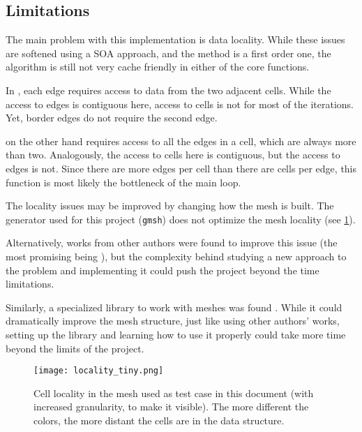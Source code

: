 \subsection{Limitations}
\label{sec:omp:limitations}


The main problem with this implementation is data locality.
While these issues are softened using a SOA approach, and the method is a first order one, the algorithm is still not very cache friendly in either of the core functions.

In \computeflux, each edge requires access to data from the two adjacent cells. While the access to edges is contiguous here, access to cells is not for most of the iterations. Yet, border edges do not require the second edge.

\update on the other hand requires access to all the edges in a cell, which are always more than two.
Analogously, the access to cells here is contiguous, but the access to edges is not.
Since there are more edges per cell than there are cells per edge, this function is most likely the bottleneck of the main loop.

The locality issues may be improved by changing how the mesh is built.
The generator used for this project (\texttt{gmsh}) does not optimize the mesh locality (see \cref{fig:locality}).

Alternatively, works from other authors were found to improve this issue (the most promising being \cite{hoppe99}), but the complexity behind studying a new approach to the problem and implementing it could push the project beyond the time limitations.

Similarly, a specialized library to work with meshes was found \cite{metis}.
While it could dramatically improve the mesh structure, just like using other authors' works, setting up the library and learning how to use it properly could take more time beyond the limits of the project.

\begin{figure}[!htp]
	\centering
	\texttt{[image: locality\_tiny.png]}
	\caption{Cell locality in the mesh used as test case in this document (with increased granularity, to make it visible). The more different the colors, the more distant the cells are in the data structure.}
	\label{fig:locality}
\end{figure}
